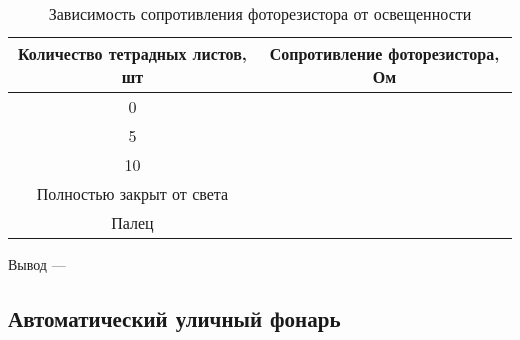 \begin{table}[h]
\centering
\caption{Зависимость сопротивления фоторезистора от освещенности}
\label{tab:11.2}
\begin{tabular}{|c|c|}
\hline
Количество тетрадных листов, шт & Сопротивление фоторезистора, Ом \\ \hline
0                               &                                 \\ \hline
5                               &                                 \\ \hline
10                              &                                 \\ \hline
Полностью закрыт от света       &                                 \\ \hline
Палец                           &                                 \\ \hline
\end{tabular}
\end{table}

Вывод --- \hrulefill

\hrulefill

\hrulefill



\subsection{Автоматический уличный фонарь}

